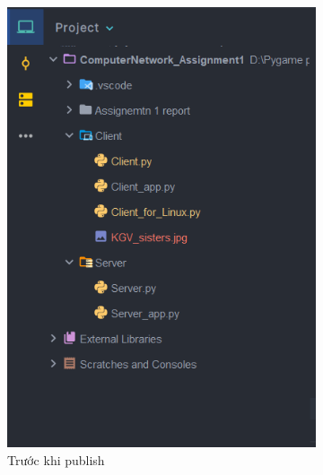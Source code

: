 \documentclass[a4paper]{article}
\begin{document}
	\begin{figure}[h]
		\begin{center}
			\begin{subfigure}[b]{0.35\textwidth}
				\centering
				\includegraphics[width=\textwidth]{tests/client_bf_publish.png}
				\hspace{\textwidth}
				\caption{Trước khi publish}
			\end{subfigure}
			\begin{subfigure}[b]{0.35\textwidth}
				\centering

\end{subfigure}
\end{center}
\end{figure}
\end{document}
